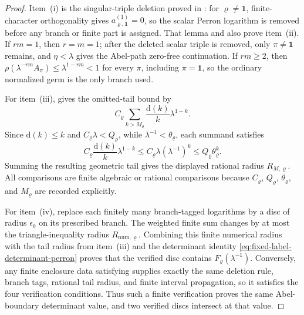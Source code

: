 \documentclass[11pt,a4paper]{amsart}
\theoremstyle{plain}
\theoremstyle{definition}
\theoremstyle{remark}
\begin{document}
\begin{proof}
  Item~\textup{(i)} is the singular-triple deletion proved in
  : for
  \(\varrho\ne\mathbf1\), finite-character orthogonality gives
  \(a_{\varrho,\mathbf1}^{(1)}=0\), so the scalar Perron logarithm is removed
  before any branch or finite part is assigned.  That lemma and
   also prove item~\textup{(ii)}.
  If \(rm=1\), then \(r=m=1\); after the deleted scalar triple is removed,
  only \(\pi\ne\mathbf1\) remains, and \(\eta<\lambda\) gives the Abel-path
  zero-free continuation.  If \(rm\ge2\), then
  \(\rho(\lambda^{-rm}A_\pi)\le\lambda^{1-rm}<1\) for every \(\pi\), including
  \(\pi=\mathbf1\), so the ordinary normalized germ is the only branch used.

  For item~\textup{(iii)},
   gives the omitted-tail bound
  by
  \[
    C_\varrho
    \sum_{k>M_\varrho}\frac{\mathrm d(k)}{k}\lambda^{1-k}.
  \]
  Since \(\mathrm d(k)\le k\) and
  \(C_\varrho\lambda<Q_\varrho\), while
  \(\lambda^{-1}<\theta_\varrho\), each summand satisfies
  \[
    C_\varrho\frac{\mathrm d(k)}{k}\lambda^{1-k}
    \le C_\varrho\lambda(\lambda^{-1})^k
    \le Q_\varrho\theta_\varrho^k .
  \]
  Summing the resulting geometric tail gives the displayed rational radius
  \(R_{M,\varrho}\).  All comparisons are finite algebraic or rational
  comparisons because \(C_\varrho\), \(Q_\varrho\), \(\theta_\varrho\), and
  \(M_\varrho\) are recorded explicitly.

  For item~\textup{(iv)}, replace each finitely many branch-tagged logarithms
  by a disc of radius \(\epsilon_0\) on its prescribed branch.  The weighted
  finite sum changes by at most the triangle-inequality radius
  \(R_{\mathrm{num},\varrho}\).  Combining this finite numerical radius with
  the tail radius from item~\textup{(iii)} and the determinant identity
  \eqref{eq:fixed-label-determinant-perron} proves that the verified disc
  contains \(F_\varrho(\lambda^{-1})\).  Conversely, any finite enclosure data satisfying
   supplies exactly the same
  deletion rule, branch tags, rational tail radius, and finite interval
  propagation, so it satisfies the four verification conditions.  Thus such a
  finite verification proves the same Abel-boundary determinant value, and two
  verified discs intersect at that value.
\end{proof}
\end{document}
